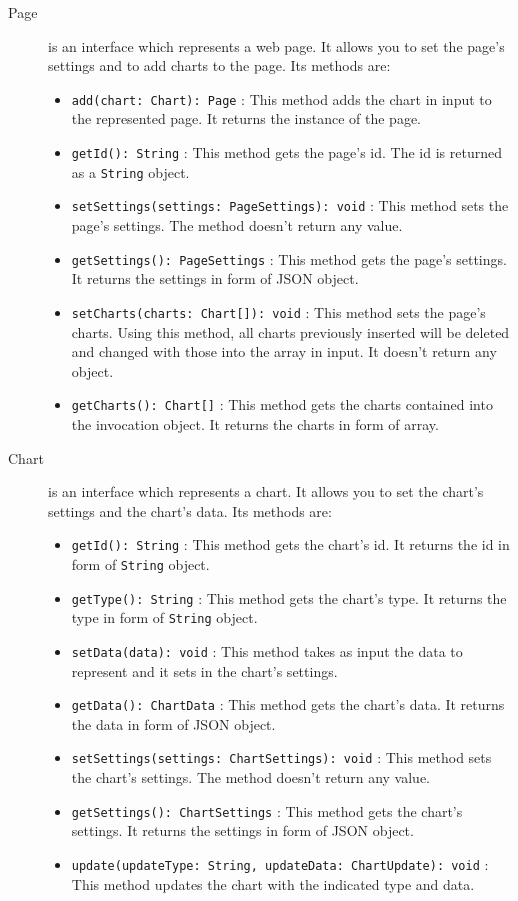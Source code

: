 \begin{description}
\begin{itemize}
		\end{itemize}
	\item[Page] is an interface which represents a web page. It allows you to set the page's settings and to add charts to the page. Its methods are:
	\begin{itemize}
		\item \texttt{add(chart: Chart): Page} : This method adds the chart in input to the represented page. It returns the instance of the page.
		\item \texttt{getId(): String} : This method gets the page's id. The id is returned as a \texttt{String} object.
		\item \texttt{setSettings(settings: PageSettings): void} : This method sets the page's settings. The method doesn't return any value.
		\item \texttt{getSettings(): PageSettings} : This method gets the page's settings. It returns the settings in form of JSON object.
		\item \texttt{setCharts(charts: Chart[]): void} : This method sets the page's charts. Using this method, all charts previously inserted will be deleted and changed with those into the array in input. It doesn't return any object.
		\item \texttt{getCharts(): Chart[]} : This method gets the charts contained into the invocation object. It returns the charts in form of array.
	\end{itemize}
	
	\item[Chart] is an interface which represents a chart. It allows you to set the chart's settings and the chart's data. Its methods are:
	\begin{itemize}
		\item \texttt{getId(): String} : This method gets the chart's id. It returns the id in form of \texttt{String} object.
		\item \texttt{getType(): String} : This method gets the chart's type. It returns the type in form of \texttt{String} object.
		\item \texttt{setData(data): void} : This method takes as input the data to represent and it sets in the chart's settings.
		\item \texttt{getData(): ChartData} : This method gets the chart's data. It returns the data in form of JSON object.
		\item \texttt{setSettings(settings: ChartSettings): void} : This method sets the chart's settings. The method doesn't return any value.
		\item \texttt{getSettings(): ChartSettings} : This method gets the chart's settings. It returns the settings in form of JSON object.
		\item \texttt{update(updateType: String, updateData: ChartUpdate): void} : This method updates the chart with the indicated type and data. 
	\end{itemize}
	\end{description}
